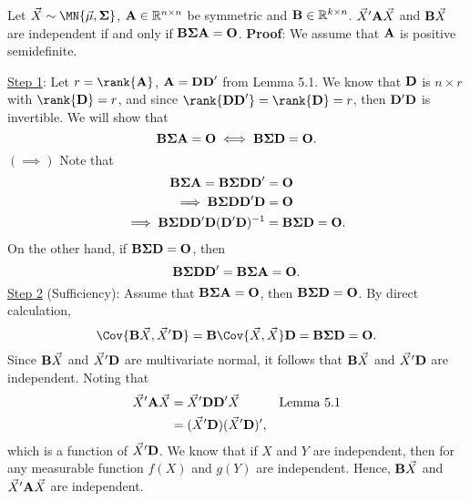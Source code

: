 \begin{Theorem}{}{}
    Let $ \Vector{X}\sim \MN{\Vector{\mu},\Matrix{\Sigma}} $,
    $ \mathbf{A}\in\mathbb{R}^{n\times n} $ be symmetric and $ \mathbf{B}\in\mathbb{R}^{k\times n} $.
    $ \vec{X}'\mathbf{A}\vec{X} $ and $ \mathbf{B}\vec{X} $
    are independent if and only if $ \mathbf{B\Sigma A}=\mathbf{O} $.
    \tcblower{}
    \textbf{Proof}: We assume that $ \mathbf{A} $ is positive semidefinite.

    \underline{Step 1}: Let $ r=\rank{\Matrix{A}} $, $ \mathbf{A}=\mathbf{DD}' $
    from Lemma 5.1. We know that $ \mathbf{D} $ is $ n\times r $ with
    $ \rank{\Matrix{D}}=r $, and since
    $ \rank{\Matrix{DD}'}=\rank{\Matrix{D}}=r $, then $ \mathbf{D}'\mathbf{D} $
    is invertible. We will show that
    \[ \mathbf{B\Sigma A}=\mathbf{O}\iff \mathbf{B\Sigma D}=\mathbf{O}. \]
    $ (\implies) $ Note that
    \begin{align*}
        \mathbf{B\Sigma A}=\mathbf{B\Sigma DD}'                             & =\mathbf{O}                     \\
        \implies \mathbf{B\Sigma DD'}\mathbf{D}                             & =\mathbf{O}                     \\
        \implies \mathbf{B\Sigma DD'}\mathbf{D}(\mathbf{D}'\mathbf{D})^{-1} & =\mathbf{B\Sigma D}=\mathbf{O}.
    \end{align*}
    On the other hand, if $ \mathbf{B\Sigma D}=\mathbf{O} $, then
    \[ \mathbf{B\Sigma DD}'=\mathbf{B\Sigma A}=\mathbf{O}. \]
    \underline{Step 2} (Sufficiency): Assume that $ \mathbf{B\Sigma A}=\mathbf{O} $,
    then $ \mathbf{B\Sigma D}=\mathbf{O} $. By direct calculation,
    \[ \Cov{\Matrix{B}\Vector{X},\Vector{X}'\Matrix{D}}=\Matrix{B}\Cov{\Vector{X},\Vector{X}}\Matrix{D}=\Matrix{B\Sigma D}=\Matrix{O}. \]
    Since $ \mathbf{B}\vec{X} $ and $ \vec{X}'\mathbf{D} $ are multivariate normal,
    it follows that $ \mathbf{B}\vec{X} $ and $ \vec{X}'\mathbf{D} $ are independent.
    Noting that
    \begin{align*}
        \vec{X}'\mathbf{A}\vec{X}
         & =\vec{X}'\mathbf{DD}'\vec{X}                &  & \text{Lemma 5.1} \\
         & =(\vec{X}'\mathbf{D})(\vec{X}'\mathbf{D})',
    \end{align*}
    which is a function of $ \vec{X}'\mathbf{D} $. We know that
    if $ X $ and $ Y $ are independent, then for any measurable function
    $ f(X) $ and $ g(Y) $ are independent. Hence,
    $ \mathbf{B}\vec{X} $ and $ \vec{X}'\mathbf{A}\vec{X} $ are independent.


\end{Theorem}
